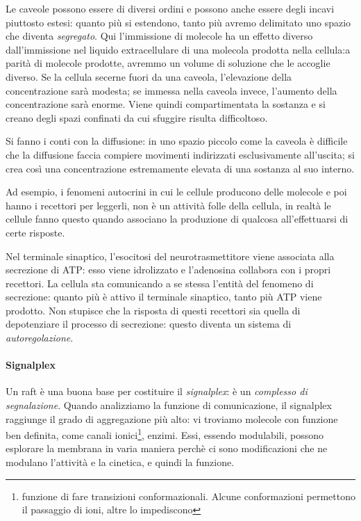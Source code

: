 \documentclass[a4paper,12pt]{article}
\begin{document}
Le caveole possono essere di diversi ordini e possono anche essere degli incavi piuttosto estesi: quanto più si estendono, tanto più avremo delimitato uno spazio che diventa \emph{segregato}. Qui l'immissione di molecole ha un effetto diverso dall'immissione nel liquido extracellulare di una molecola prodotta nella cellula:a parità di molecole prodotte, avremmo un volume di soluzione che le accoglie diverso. Se la cellula secerne fuori da una caveola, l'elevazione della concentrazione sarà modesta; se immessa nella caveola invece, l'aumento della concentrazione sarà enorme. Viene quindi compartimentata la sostanza e si creano degli spazi confinati da cui sfuggire risulta difficoltoso.

Si fanno i conti con la diffusione: in uno spazio piccolo come la caveola è difficile che la diffusione faccia compiere movimenti indirizzati esclusivamente all'uscita; si crea così una concentrazione estremamente elevata di una sostanza al suo interno.

Ad esempio, i fenomeni autocrini in cui le cellule producono delle molecole e poi hanno i recettori per leggerli, non è un attività folle della cellula, in realtà le cellule fanno questo quando associano la produzione di qualcosa all'effettuarsi di certe risposte.


Nel terminale sinaptico, l'esocitosi del neurotrasmettitore viene associata alla secrezione di ATP: esso viene idrolizzato e l'adenosina collabora con i propri recettori. La cellula sta comunicando a se stessa l'entità del fenomeno di secrezione: quanto più è attivo il terminale sinaptico, tanto più ATP viene prodotto. Non stupisce che la risposta di questi recettori sia quella di depotenziare il processo di secrezione: questo diventa un sistema di \emph{autoregolazione}.

\paragraph{Signalplex}

Un raft è una buona base per costituire il \emph{signalplex}: è un \emph{complesso di segnalazione}. Quando analizziamo la funzione di comunicazione, il signalplex raggiunge il grado di aggregazione più alto: vi troviamo molecole con funzione ben definita, come canali ionici\footnote{funzione di fare transizioni conformazionali. Alcune conformazioni permettono il passaggio di ioni, altre lo impediscono}, enzimi. Essi, essendo modulabili, possono esplorare la membrana in varia maniera perchè ci sono modificazioni che ne modulano l'attività e la cinetica, e quindi la funzione. 
\end{document}
